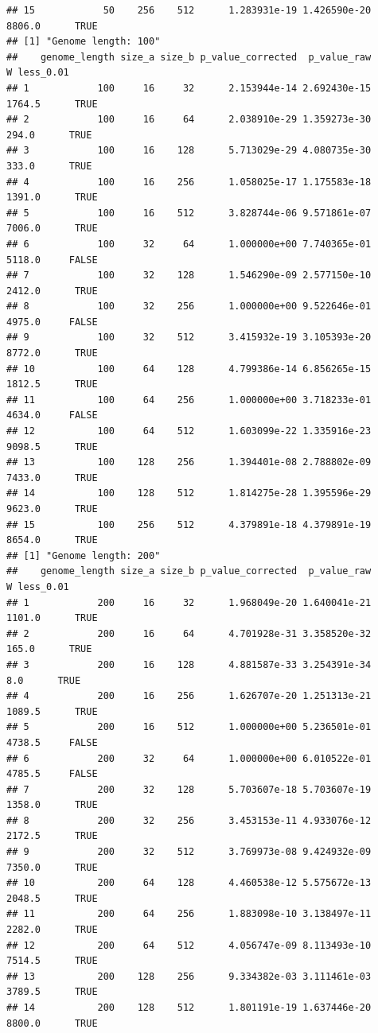 \documentclass[
]{book}
\begin{document}
\begin{verbatim}
## 15            50    256    512      1.283931e-19 1.426590e-20 8806.0      TRUE
## [1] "Genome length: 100"
##    genome_length size_a size_b p_value_corrected  p_value_raw      W less_0.01
## 1            100     16     32      2.153944e-14 2.692430e-15 1764.5      TRUE
## 2            100     16     64      2.038910e-29 1.359273e-30  294.0      TRUE
## 3            100     16    128      5.713029e-29 4.080735e-30  333.0      TRUE
## 4            100     16    256      1.058025e-17 1.175583e-18 1391.0      TRUE
## 5            100     16    512      3.828744e-06 9.571861e-07 7006.0      TRUE
## 6            100     32     64      1.000000e+00 7.740365e-01 5118.0     FALSE
## 7            100     32    128      1.546290e-09 2.577150e-10 2412.0      TRUE
## 8            100     32    256      1.000000e+00 9.522646e-01 4975.0     FALSE
## 9            100     32    512      3.415932e-19 3.105393e-20 8772.0      TRUE
## 10           100     64    128      4.799386e-14 6.856265e-15 1812.5      TRUE
## 11           100     64    256      1.000000e+00 3.718233e-01 4634.0     FALSE
## 12           100     64    512      1.603099e-22 1.335916e-23 9098.5      TRUE
## 13           100    128    256      1.394401e-08 2.788802e-09 7433.0      TRUE
## 14           100    128    512      1.814275e-28 1.395596e-29 9623.0      TRUE
## 15           100    256    512      4.379891e-18 4.379891e-19 8654.0      TRUE
## [1] "Genome length: 200"
##    genome_length size_a size_b p_value_corrected  p_value_raw      W less_0.01
## 1            200     16     32      1.968049e-20 1.640041e-21 1101.0      TRUE
## 2            200     16     64      4.701928e-31 3.358520e-32  165.0      TRUE
## 3            200     16    128      4.881587e-33 3.254391e-34    8.0      TRUE
## 4            200     16    256      1.626707e-20 1.251313e-21 1089.5      TRUE
## 5            200     16    512      1.000000e+00 5.236501e-01 4738.5     FALSE
## 6            200     32     64      1.000000e+00 6.010522e-01 4785.5     FALSE
## 7            200     32    128      5.703607e-18 5.703607e-19 1358.0      TRUE
## 8            200     32    256      3.453153e-11 4.933076e-12 2172.5      TRUE
## 9            200     32    512      3.769973e-08 9.424932e-09 7350.0      TRUE
## 10           200     64    128      4.460538e-12 5.575672e-13 2048.5      TRUE
## 11           200     64    256      1.883098e-10 3.138497e-11 2282.0      TRUE
## 12           200     64    512      4.056747e-09 8.113493e-10 7514.5      TRUE
## 13           200    128    256      9.334382e-03 3.111461e-03 3789.5      TRUE
## 14           200    128    512      1.801191e-19 1.637446e-20 8800.0      TRUE

\end{verbatim}
\end{document}
